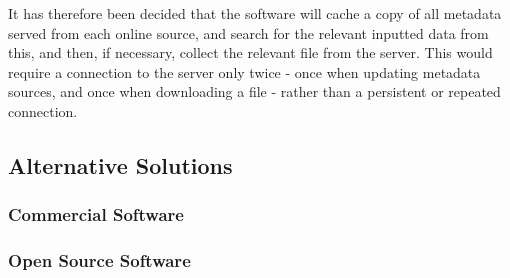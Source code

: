 It has therefore been decided that the software will cache a copy of all metadata served from each online source, and search for the relevant inputted data from this, and then, if necessary, collect the relevant file from the server. This would require a connection to the server only twice - once when updating metadata sources, and once when downloading a file - rather than a persistent or repeated connection.
\subsection{Alternative Solutions}
\subsubsection{Commercial Software}
\subsubsection{Open Source Software}